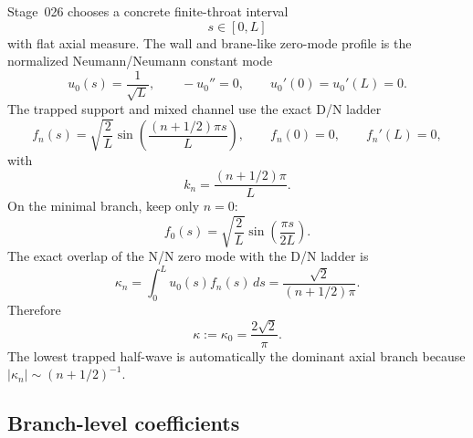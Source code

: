 Stage~026 chooses a concrete finite-throat interval
\begin{equation}
s\in[0,L]
\end{equation}
with flat axial measure.  The wall and brane-like zero-mode profile is the normalized Neumann/Neumann constant mode
\begin{equation}
\label{eq:part02-u0}
u_0(s)=\frac{1}{\sqrt L},
\qquad
-u_0''=0,
\qquad
u_0'(0)=u_0'(L)=0.
\end{equation}
The trapped support and mixed channel use the exact D/N ladder
\begin{equation}
\label{eq:part02-DN-ladder}
f_n(s)=\sqrt{\frac2L}\sin\!\left(\frac{(n+1/2)\pi s}{L}\right),
\qquad
f_n(0)=0,
\qquad
f_n'(L)=0,
\end{equation}
with
\begin{equation}
k_n=\frac{(n+1/2)\pi}{L}.
\end{equation}
On the minimal branch, keep only \(n=0\):
\begin{equation}
f_0(s)=\sqrt{\frac2L}\sin\!\left(\frac{\pi s}{2L}\right).
\end{equation}
The exact overlap of the N/N zero mode with the D/N ladder is
\begin{equation}
\label{eq:part02-kappa-n}
\kappa_n=\int_0^L u_0(s)f_n(s)\,ds
=\frac{\sqrt2}{(n+1/2)\pi}.
\end{equation}
Therefore
\begin{equation}
\label{eq:part02-kappa0}
\boxed{
\kappa:=\kappa_0=\frac{2\sqrt2}{\pi}}.
\end{equation}
The lowest trapped half-wave is automatically the dominant axial branch because \(|\kappa_n|\sim(n+1/2)^{-1}\).

\subsection{Branch-level coefficients}
\label{subsec:part02-stage026-branch-coefficients}

